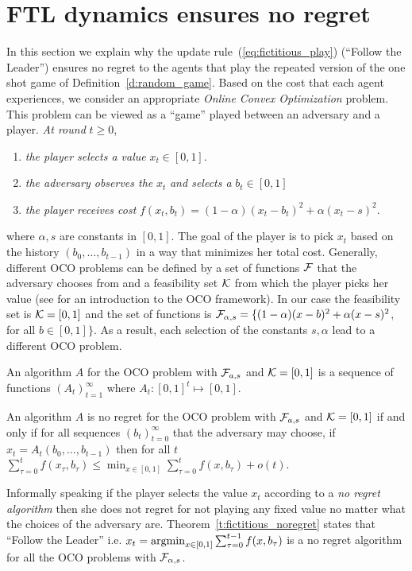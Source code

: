\section{FTL dynamics ensures no regret}\label{s:fictitious_noregret}
In this section we explain why the
update rule~(\ref{eq:fictitious_play}) (\enquote{Follow the Leader}) ensures
no regret to the agents that play the repeated version of the one shot
game of Definition~\ref{d:random_game}.
Based on the cost that each agent experiences,
we consider an appropriate \emph{Online Convex Optimization} problem.
This problem can be viewed as a \enquote{game} played between an
adversary and a player. \emph{At round }$t\geq 0$,
\begin{enumerate}
  \item \emph{the player selects a value }$x_t \in [0,1]$.
  \item \emph{the adversary observes the }$x_t$ \emph{and selects a} $b_t \in [0,1]$
  \item \emph{the player receives cost} $f(x_t,b_t)=(1-\alpha)(x_t-b_t)^2 + \alpha(x_t -s)^2$.
\end{enumerate}
where $\alpha,s$ are constants in $[0,1]$. The goal of
the player is to pick $x_t$ based on the history
$(b_0,\ldots,b_{t-1})$ in a way that minimizes her total cost.
Generally, different OCO problems can be defined by a set of functions
$\mathcal{F}$ that the adversary chooses from and a feasibility
set $\mathcal{K}$ from which the player picks her value (see \cite{Haz16}
for an introduction to the OCO framework).
In our case the feasibility set is $\mathcal{K}=[0,1]$ and the set of functions
is $\mathcal{F}_{\alpha,s} = \{(1-\alpha)(x-b)^2 + \alpha(x -s)^2$, for all
$b \in [0,1]\}$.
As a result, each selection of the
constants $s,\alpha$ lead to a different OCO problem.

\begin{definition}\label{d:OCO_algo}
An algorithm $A$ for the OCO problem with $\mathcal{F}_{a,s}$ and
$\mathcal{K}=[0,1]$ is a sequence of functions $(A_t)_{t=1}^\infty$ where $A_t:[0,1]^t \mapsto [0,1]$.
\end{definition}

\begin{definition}\label{d:no_regret_algo}
An algorithm $A$ is no regret for the OCO problem with $\mathcal{F}_{a,s}$ and
$\mathcal{K}=[0,1]$ if and only if for all sequences $(b_t)_{t=0}^\infty$ that the
adversary may choose, if $x_t = A_t(b_0,\dots,b_{t-1})$ then for all $t$
\(\sum_{\tau=0}^t f(x_\tau,b_\tau)  \leq \min_{x \in [0,1]}\sum_{\tau=0}^t f(x,b_\tau) + o(t).\)
\end{definition}
Informally speaking if the player selects the value
$x_t$ according to a \emph{no regret algorithm} then
she does not regret for not playing any fixed value no
matter what the choices of the adversary are.
Theorem~\ref{t:fictitious_noregret} states that
\enquote{Follow the Leader} i.e. $x_t = \operatorname*{argmin}_{x \in [0,1]}\sum_{\tau=0}^{t-1}f(x,b_\tau)$
is a no regret algorithm for all the OCO problems with $\mathcal{F}_{\alpha,s}$.


